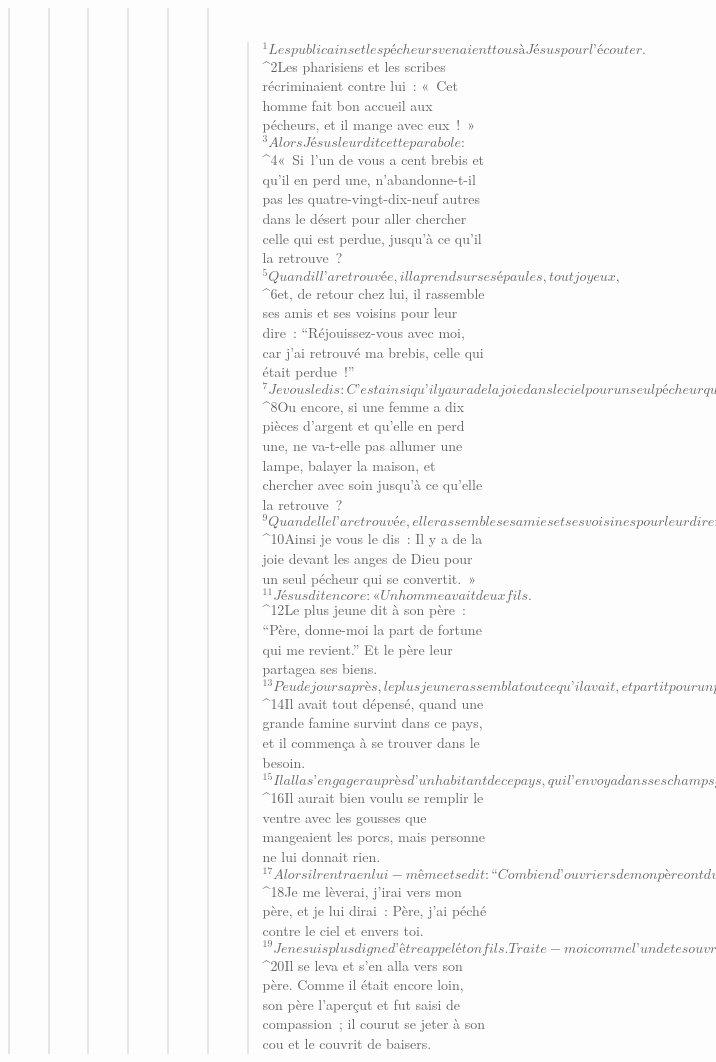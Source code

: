 \begin{verse}
\begin{verse}
\begin{verse}
\begin{verse}
\begin{verse}
\begin{verse}
         
      \bchapter{}
      \begin{verse}
${}^{1}Les publicains et les pécheurs venaient tous à Jésus pour l’écouter. 
${}^{2}Les pharisiens et les scribes récriminaient contre lui : « Cet homme fait bon accueil aux pécheurs, et il mange avec eux ! »
${}^{3}Alors Jésus leur dit cette parabole : 
${}^{4}« Si l’un de vous a cent brebis et qu’il en perd une, n’abandonne-t-il pas les quatre-vingt-dix-neuf autres dans le désert pour aller chercher celle qui est perdue, jusqu’à ce qu’il la retrouve ? 
${}^{5}Quand il l’a retrouvée, il la prend sur ses épaules, tout joyeux, 
${}^{6}et, de retour chez lui, il rassemble ses amis et ses voisins pour leur dire : “Réjouissez-vous avec moi, car j’ai retrouvé ma brebis, celle qui était perdue !” 
${}^{7}Je vous le dis : C’est ainsi qu’il y aura de la joie dans le ciel pour un seul pécheur qui se convertit, plus que pour quatre-vingt-dix-neuf justes qui n’ont pas besoin de conversion.
${}^{8}Ou encore, si une femme a dix pièces d’argent et qu’elle en perd une, ne va-t-elle pas allumer une lampe, balayer la maison, et chercher avec soin jusqu’à ce qu’elle la retrouve ? 
${}^{9}Quand elle l’a retrouvée, elle rassemble ses amies et ses voisines pour leur dire : “Réjouissez-vous avec moi, car j’ai retrouvé la pièce d’argent que j’avais perdue !” 
${}^{10}Ainsi je vous le dis : Il y a de la joie devant les anges de Dieu pour un seul pécheur qui se convertit. »
${}^{11}Jésus dit encore : « Un homme avait deux fils. 
${}^{12}Le plus jeune dit à son père : “Père, donne-moi la part de fortune qui me revient.” Et le père leur partagea ses biens. 
${}^{13}Peu de jours après, le plus jeune rassembla tout ce qu’il avait, et partit pour un pays lointain où il dilapida sa fortune en menant une vie de désordre. 
${}^{14}Il avait tout dépensé, quand une grande famine survint dans ce pays, et il commença à se trouver dans le besoin. 
${}^{15}Il alla s’engager auprès d’un habitant de ce pays, qui l’envoya dans ses champs garder les porcs. 
${}^{16}Il aurait bien voulu se remplir le ventre avec les gousses que mangeaient les porcs, mais personne ne lui donnait rien. 
${}^{17}Alors il rentra en lui-même et se dit : “Combien d’ouvriers de mon père ont du pain en abondance, et moi, ici, je meurs de faim ! 
${}^{18}Je me lèverai, j’irai vers mon père, et je lui dirai : Père, j’ai péché contre le ciel et envers toi. 
${}^{19}Je ne suis plus digne d’être appelé ton fils. Traite-moi comme l’un de tes ouvriers.” 
${}^{20}Il se leva et s’en alla vers son père. Comme il était encore loin, son père l’aperçut et fut saisi de compassion ; il courut se jeter à son cou et le couvrit de baisers. 

\end{verse}
\end{verse}
\end{verse}
\end{verse}
\end{verse}
\end{verse}
\end{verse}
